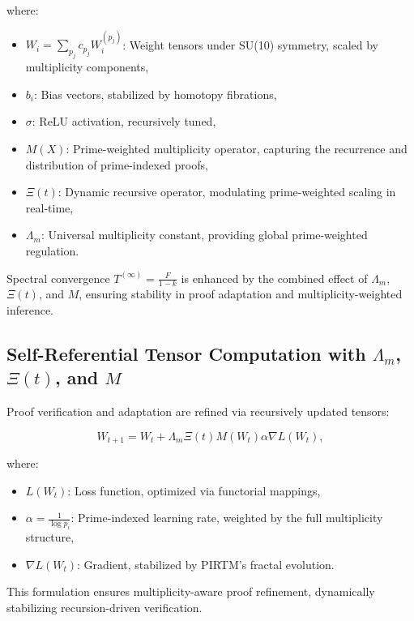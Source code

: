 \documentclass[12pt]{article}
\theoremstyle{plain}
\begin{document}
where:

\begin{itemize}
    \item \( W_i = \sum_{p_j} c_{p_j} W_i^{(p_j)} \): Weight tensors under SU(10) symmetry, scaled by multiplicity components,
    \item \( b_i \): Bias vectors, stabilized by homotopy fibrations,
    \item \( \sigma \): ReLU activation, recursively tuned,
    \item \( M(X) \): Prime-weighted multiplicity operator, capturing the recurrence and distribution of prime-indexed proofs,
    \item \( \Xi(t) \): Dynamic recursive operator, modulating prime-weighted scaling in real-time,
    \item \( \Lambda_m \): Universal multiplicity constant, providing global prime-weighted regulation.
\end{itemize}

Spectral convergence \( T^{(\infty)} = \frac{F}{1 - k} \) is enhanced by the combined effect of \(\Lambda_m\), \(\Xi(t)\), and \(M\), ensuring stability in proof adaptation and multiplicity-weighted inference.

\subsection{Self-Referential Tensor Computation with \(\Lambda_m\), \(\Xi(t)\), and \(M\)}

Proof verification and adaptation are refined via recursively updated tensors:

\begin{equation}
W_{t+1} = W_t + \Lambda_m \Xi(t) M(W_t) \alpha \nabla L(W_t),
\end{equation}

where:

\begin{itemize}
    \item \( L(W_t) \): Loss function, optimized via functorial mappings,
    \item \( \alpha = \frac{1}{\log p_i} \): Prime-indexed learning rate, weighted by the full multiplicity structure,
    \item \( \nabla L(W_t) \): Gradient, stabilized by PIRTM’s fractal evolution.
\end{itemize}

This formulation ensures multiplicity-aware proof refinement, dynamically stabilizing recursion-driven verification.
\end{document}
